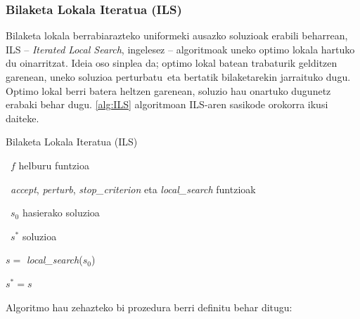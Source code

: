 \documentclass[eu]{ifirak}\usepackage[]{graphicx}\usepackage[]{color}
\newcommand{\zkk}{\guillemotleft}
\newcommand{\skk}{\guillemotright}
\begin{document}
\subsubsection{Bilaketa Lokala Iteratua (ILS)}

Bilaketa lokala berrabiarazteko uniformeki ausazko soluzioak erabili beharrean, ILS -- \textit{Iterated Local Search}, ingelesez -- algoritmoak uneko optimo lokala hartuko du oinarritzat. Ideia oso sinplea da; optimo lokal batean trabaturik gelditzen garenean, uneko soluzioa \zkk perturbatu\skk\ eta bertatik bilaketarekin jarraituko dugu. Optimo lokal berri batera heltzen garenean, soluzio hau onartuko dugunetz erabaki behar dugu. \ref{alg:ILS} algoritmoan ILS-aren sasikode orokorra ikusi daiteke.

\begin{ifalgorithm}[t]
\begin{ifpseudo}{Bilaketa Lokala Iteratua (ILS)}
\item \In\ $f$ helburu funtzioa
\item \In\ \textit{accept}, \textit{perturb}, \textit{stop\_criterion} eta \textit{local\_search} funtzioak
\item \In\ $s_0$ hasierako soluzioa
\item \Out\ $s^*$ soluzioa
\item $s = $ \textit{local\_search}($s_0$)
\item $s^* = s$
\item {}
\item {}
\item {}
\item {}
\item {}
\item \Done
\end{ifpseudo}
\caption{Bilaketa Lokala Iteratuaren (ILS) sasikodea}\label{alg:ILS}
\end{ifalgorithm}

Algoritmo hau zehazteko bi prozedura berri definitu behar ditugu:
\end{document}
